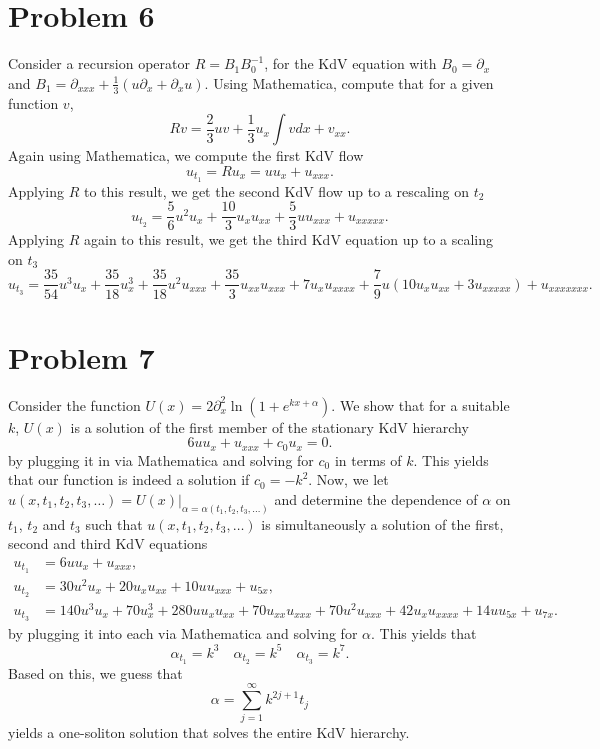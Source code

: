 \documentclass{article}
\begin{document}
\section{Problem 6}
Consider a recursion operator $R=B_1
B_0^{-1}$, for the KdV equation with $B_0=\partial_x$ and $B_1=
\partial_{xxx}+\frac{1}{3}(u\partial_x+\partial_x u)$. Using Mathematica, compute that for a given function $v$,
\[
Rv=\frac{2}{3}uv+\frac{1}{3}u_x\int vdx+v_{xx}.
\]
Again using Mathematica, we compute the first KdV flow
\[
u_{t_1}=Ru_x=uu_x+u_{xxx}.
\]
Applying $R$ to this result, we get the second KdV flow up to a rescaling on $t_2$
\[
u_{t_2}=\frac{5}{6}u^2u_x+\frac{10}{3}u_xu_{xx}+\frac{5}{3}uu_{xxx}+u_{xxxxx}.
\]
Applying $R$ again to this result, we get the third KdV equation up to a scaling on $t_3$
\[
u_{t_3}=\frac{35}{54}u^3u_x+\frac{35}{18}u_x^3+\frac{35}{18}u^2u_{xxx}+\frac{35}{3}u_{xx}u_{xxx}+7u_xu_{xxxx}+\frac{7}{9}u(10u_xu_{xx}+3u_{xxxxx})+u_{xxxxxxx}.
\]

\section{Problem 7}
Consider the function $U(x)=2\partial_x^2\ln\left(1+e^{kx+\alpha}\right)$.
We show that for a suitable $k$, $U(x)$ is a solution of the first member of the
stationary KdV hierarchy
$$
6uu_x+u_{xxx}+c_0 u_x=0.
$$
by plugging it in via Mathematica and solving for $c_0$ in terms of $k$. This yields that our function is indeed a solution if $c_0=-k^2$. Now, we let
$u(x,t_1,t_2,t_3,\ldots)=U(x)|_{\alpha=\alpha(t_1,t_2,t_3,\ldots)}$ and determine
the dependence of $\alpha$ on $t_1$, $t_2$ and $t_3$ such that
$u(x,t_1,t_2,t_3,\ldots)$ is simultaneously a solution of the first, second and
third KdV equations
\begin{align*}
u_{t_1}&=6 u u_x+u_{xxx},\\\nonumber
u_{t_2}&=30u^2u_x+20u_x u_{xx}+10u u_{xxx}+u_{5x},\\\nonumber
u_{t_3}&=140 u^3 u_x+70 u_x^3+280 u u_x u_{xx}+70 u_{xx}u_{xxx}+70
u^2 u_{xxx}+42u_x u_{xxxx}+14 u u_{5x}+u_{7x}.
\end{align*}
by plugging it into each via Mathematica and solving for $\alpha$. This yields that
\[
\alpha_{t_1}=k^3\quad\alpha_{t_2}=k^5\quad\alpha_{t_3}=k^7.
\]
Based on this, we guess that
\[
\alpha=\sum_{j=1}^{\infty}k^{2j+1}t_j
\]
yields a one-soliton solution that
solves the entire KdV hierarchy.
\end{document}
